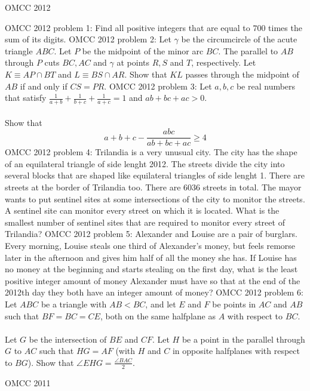 OMCC 2012 

OMCC 2012 problem 1:  Find all positive integers that are equal to $700$ times the sum of its digits. 
OMCC 2012 problem 2:  Let $\gamma$ be the circumcircle of the acute triangle $ABC$. Let $P$ be the midpoint of the minor arc $BC$. The parallel to $AB$ through $P$ cuts $BC, AC$ and $\gamma$ at points $R,S$ and $T$, respectively. Let $K \equiv AP \cap BT$ and $L \equiv BS \cap AR$.  Show that $KL$ passes through the midpoint of $AB$ if and only if $CS = PR$. 
OMCC 2012 problem 3:  Let $a,b,c$ be real numbers that satisfy $\frac{1}{a+b}+\frac{1}{b+c}+\frac{1}{a+c} =1$ and $ab+bc+ac >0$. \\\\
Show that
\[ a+b+c - \frac{abc}{ab+bc+ac} \ge 4 \] 
OMCC 2012 problem 4:  Trilandia is a very unusual city. The city has the shape of an equilateral triangle of side lenght 2012. The streets divide the city into several blocks that are shaped like equilateral triangles of side lenght 1. There are streets at the border of Trilandia too. There are 6036 streets in total. The mayor wants to put sentinel sites at some intersections of the city to monitor the streets. A sentinel site can monitor every street on which it is located. What is the smallest number of sentinel sites that are required to monitor every street of Trilandia? 
OMCC 2012 problem 5:  Alexander and Louise are a pair of burglars. Every morning, Louise steals one third of Alexander's money, but feels remorse later in the afternoon and gives him half of all the money she has. If Louise has no money at the beginning and starts stealing on the first day, what is the least positive integer amount of money Alexander must have so that at the end of the 2012th day they both have an integer amount of money? 
OMCC 2012 problem 6:  Let $ABC$ be a triangle with $AB < BC$, and let $E$ and $F$ be points in $AC$ and $AB$ such that $BF = BC = CE$, both on the same halfplane as $A$ with respect to  $BC$. \\\\
Let $G$ be the intersection of $BE$ and $CF$. Let $H$ be a point in the parallel through $G$ to $AC$ such that $HG = AF$ (with $H$ and $C$ in opposite halfplanes with respect to $BG$). Show that $\angle EHG = \frac{\angle BAC}{2}$. 

OMCC 2011 

